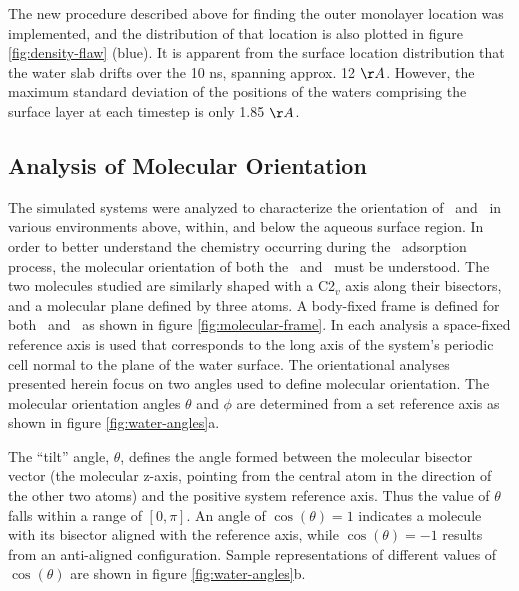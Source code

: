 The new procedure described above for finding the outer monolayer location was implemented, and the distribution of that location is also plotted in figure \ref{fig:density-flaw} (blue). It is apparent from the surface location distribution that the water slab drifts over the 10 ns, spanning approx. 12 $\AA$. However, the maximum standard deviation of the positions of the waters comprising the surface layer at each timestep is only 1.85 $\AA$. 



\subsection{Analysis of Molecular Orientation}

	The simulated systems were analyzed to characterize the orientation of \wat~and \suldiox~in various environments above, within, and below the aqueous surface region. In order to better understand the chemistry occurring during the \suldiox~adsorption process, the molecular orientation of both the \wat~and \suldiox~must be understood.  The two molecules studied are similarly shaped with a C2$_v$ axis along their bisectors, and a molecular plane defined by three atoms. A body-fixed frame is defined for both \wat~and \suldiox~as shown in figure \ref{fig:molecular-frame}. In each analysis a space-fixed reference axis is used that corresponds to the long axis of the system's periodic cell normal to the plane of the water surface. The orientational analyses presented herein focus on two angles used to define molecular orientation. The molecular orientation angles $\theta$ and $\phi$ are determined from a set reference axis as shown in figure \ref{fig:water-angles}a.
	
	The ``tilt'' angle, $\theta$, defines the angle formed between the molecular bisector vector (the molecular z-axis, pointing from the central atom in the direction of the other two atoms) and the positive system reference axis. Thus the value of $\theta$ falls within a range of $[0,\pi]$. An angle of $\cos(\theta)=1$ indicates a molecule with its bisector aligned with the reference axis, while $\cos(\theta)=-1$ results from an anti-aligned configuration. Sample representations of different values of $\cos(\theta)$ are shown in figure \ref{fig:water-angles}b.
	
